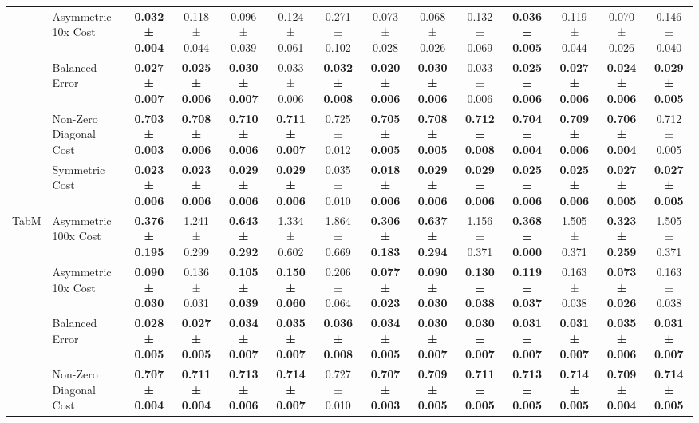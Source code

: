 \begin{table}[H]
{\begin{tabular}{llcccccccccccc}
 & Asymmetric 10x Cost & \textbf{0.032 ± 0.004} & 0.118 ± 0.044 & 0.096 ± 0.039 & 0.124 ± 0.061 & 0.271 ± 0.102 & 0.073 ± 0.028 & 0.068 ± 0.026 & 0.132 ± 0.069 & \textbf{0.036 ± 0.005} & 0.119 ± 0.044 & 0.070 ± 0.026 & 0.146 ± 0.040 \\
 & Balanced Error & \textbf{0.027 ± 0.007} & \textbf{0.025 ± 0.006} & \textbf{0.030 ± 0.007} & 0.033 ± 0.006 & \textbf{0.032 ± 0.008} & \textbf{0.020 ± 0.006} & \textbf{0.030 ± 0.006} & 0.033 ± 0.006 & \textbf{0.025 ± 0.006} & \textbf{0.027 ± 0.006} & \textbf{0.024 ± 0.006} & \textbf{0.029 ± 0.005} \\
 & Non-Zero Diagonal Cost & \textbf{0.703 ± 0.003} & \textbf{0.708 ± 0.006} & \textbf{0.710 ± 0.006} & \textbf{0.711 ± 0.007} & 0.725 ± 0.012 & \textbf{0.705 ± 0.005} & \textbf{0.708 ± 0.005} & \textbf{0.712 ± 0.008} & \textbf{0.704 ± 0.004} & \textbf{0.709 ± 0.006} & \textbf{0.706 ± 0.004} & 0.712 ± 0.005 \\
 & Symmetric Cost & \textbf{0.023 ± 0.006} & \textbf{0.023 ± 0.006} & \textbf{0.029 ± 0.006} & \textbf{0.029 ± 0.006} & 0.035 ± 0.010 & \textbf{0.018 ± 0.006} & \textbf{0.029 ± 0.006} & \textbf{0.029 ± 0.006} & \textbf{0.025 ± 0.006} & \textbf{0.025 ± 0.006} & \textbf{0.027 ± 0.005} & \textbf{0.027 ± 0.005} \\
\cline{1-14}
\multirow[t]{5}{*}{TabM} & Asymmetric 100x Cost & \textbf{0.376 ± 0.195} & 1.241 ± 0.299 & \textbf{0.643 ± 0.292} & 1.334 ± 0.602 & 1.864 ± 0.669 & \textbf{0.306 ± 0.183} & \textbf{0.637 ± 0.294} & 1.156 ± 0.371 & \textbf{0.368 ± 0.000} & 1.505 ± 0.371 & \textbf{0.323 ± 0.259} & 1.505 ± 0.371 \\
 & Asymmetric 10x Cost & \textbf{0.090 ± 0.030} & 0.136 ± 0.031 & \textbf{0.105 ± 0.039} & \textbf{0.150 ± 0.060} & 0.206 ± 0.064 & \textbf{0.077 ± 0.023} & \textbf{0.090 ± 0.030} & \textbf{0.130 ± 0.038} & \textbf{0.119 ± 0.037} & 0.163 ± 0.038 & \textbf{0.073 ± 0.026} & 0.163 ± 0.038 \\
 & Balanced Error & \textbf{0.028 ± 0.005} & \textbf{0.027 ± 0.005} & \textbf{0.034 ± 0.007} & \textbf{0.035 ± 0.007} & \textbf{0.036 ± 0.008} & \textbf{0.034 ± 0.005} & \textbf{0.030 ± 0.007} & \textbf{0.030 ± 0.007} & \textbf{0.031 ± 0.007} & \textbf{0.031 ± 0.007} & \textbf{0.035 ± 0.006} & \textbf{0.031 ± 0.007} \\
 & Non-Zero Diagonal Cost & \textbf{0.707 ± 0.004} & \textbf{0.711 ± 0.004} & \textbf{0.713 ± 0.006} & \textbf{0.714 ± 0.007} & 0.727 ± 0.010 & \textbf{0.707 ± 0.003} & \textbf{0.709 ± 0.005} & \textbf{0.711 ± 0.005} & \textbf{0.713 ± 0.005} & \textbf{0.714 ± 0.005} & \textbf{0.709 ± 0.004} & \textbf{0.714 ± 0.005} \\

\end{tabular}}
\end{table}
